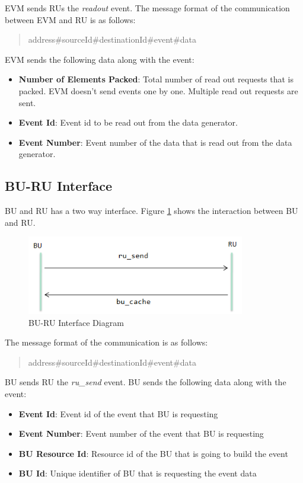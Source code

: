 EVM sends RUs the \textit{readout} event. The message format of the communication between EVM and RU is as follows:

\begin{quote}
	address\#sourceId\#destinationId\#event\#data
\end{quote}

EVM sends the following data along with the event:

\begin{itemize}
	\item \textbf{Number of Elements Packed}: Total number of read out requests that is packed. EVM doesn't send events one by one. Multiple read out requests are sent.
	\item \textbf{Event Id}: Event id to be read out from the data generator.
	\item \textbf{Event Number}: Event number of the data that is read out from the data generator.
\end{itemize}


\subsection{BU-RU Interface}

BU and RU has a two way interface. Figure \ref{fig:bu-ru} shows the interaction between BU and RU.

\begin{figure}
	\centering
		\includegraphics[width=0.85\textwidth]{figures/bu-ru.png}
	\caption{BU-RU Interface Diagram}
	\label{fig:bu-ru}
\end{figure}

The message format of the communication is as follows:

\begin{quote}
	address\#sourceId\#destinationId\#event\#data
\end{quote}

BU sends RU the \textit{ru\_send} event. BU sends the following data along with the event:

\begin{itemize}
	\item \textbf{Event Id}: Event id of the event that BU is requesting
	\item \textbf{Event Number}: Event number of the event that BU is requesting
	\item \textbf{BU Resource Id}: Resource id of the BU that is going to build the event
	\item \textbf{BU Id}: Unique identifier of BU that is requesting the event data
\end{itemize}

